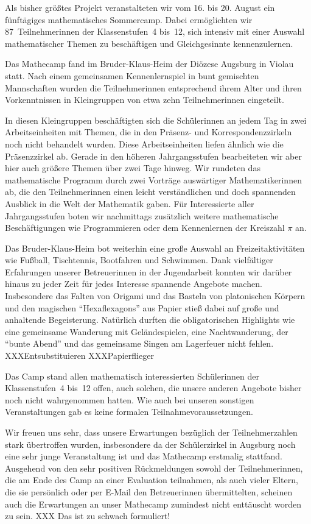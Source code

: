 \documentclass[12pt]{zettel}
\newcommand{\twopics}[2]{%
  \begin{figure}[b]
    \makebox[\textwidth][c]{%
      \texttt{[image: impressionen/\#1]}%
      \hspace*{1cm}%
      \texttt{[image: impressionen/\#2]}%
    }
  \end{figure}
}
\begin{document}
Als bisher größtes Projekt veranstalteten wir vom 16. bis 20. August ein fünftägiges
mathematisches Sommercamp. Dabei ermöglichten wir 87~Teilnehmerinnen
der Klassenstufen~4 bis~12, sich intensiv mit einer Auswahl
mathematischer Themen zu beschäftigen und Gleichgesinnte kennenzulernen.

Das Mathecamp fand im Bruder-Klaus-Heim der Diözese Augsburg in Violau statt. Nach einem gemeinsamen Kennenlernspiel in bunt gemischten Mannschaften wurden die Teilnehmerinnen
entsprechend ihrem Alter und ihren Vorkenntnissen in Kleingruppen von etwa zehn Teilnehmerinnen eingeteilt.

In diesen Kleingruppen beschäftigten sich die Schülerinnen an jedem Tag
in zwei Arbeitseinheiten mit Themen, die in den Präsenz- und Korrespondenzzirkeln noch nicht behandelt wurden. Diese Arbeitseinheiten liefen ähnlich wie die Präsenzzirkel ab.
Gerade in den höheren Jahrgangsstufen bearbeiteten wir aber hier auch größere Themen über zwei Tage hinweg. Wir rundeten das mathematische
Programm durch zwei Vorträge auswärtiger Mathematikerinnen ab, die den Teilnehmerinnen einen leicht verständlichen und doch
spannenden Ausblick in die Welt der Mathematik gaben. Für Interessierte aller Jahrgangsstufen boten wir nachmittags zusätzlich weitere mathematische Beschäftigungen wie Programmieren
oder dem Kennenlernen der Kreiszahl $\pi$ an.

\twopics{klein-07}{klein-08}

Das Bruder-Klaus-Heim bot weiterhin eine große Auswahl an Freizeitaktivitäten wie Fußball, Tischtennis, Bootfahren und Schwimmen. Dank vielfältiger Erfahrungen unserer Betreuerinnen
in der Jugendarbeit konnten wir darüber hinaus zu jeder Zeit für jedes Interesse spannende Angebote machen. Insbesondere das Falten von Origami und das Basteln von platonischen
Körpern und den magischen "`Hexaflexagons"' aus Papier stieß dabei auf große und anhaltende Begeisterung. Natürlich durften die obligatorischen Highlights wie eine gemeinsame
Wanderung mit Geländespielen, eine Nachtwanderung, der "`bunte Abend"' und das gemeinsame Singen am Lagerfeuer nicht fehlen. XXXEntsubstituieren XXXPapierflieger

Das Camp stand allen mathematisch interessierten Schülerinnen der
Klassenstufen~4 bis~12 offen, auch solchen, die unsere anderen Angebote bisher
noch nicht wahrgenommen hatten. Wie auch bei unseren sonstigen Veranstaltungen
gab es keine formalen Teilnahmevoraussetzungen.

Wir freuen uns sehr, dass unsere Erwartungen bezüglich der Teilnehmerzahlen stark übertroffen wurden, insbesondere da der Schülerzirkel in Augsburg noch eine sehr junge
Veranstaltung ist und das Mathecamp erstmalig stattfand. Ausgehend von den sehr positiven Rückmeldungen sowohl der Teilnehmerinnen, die am Ende des Camp an einer Evaluation
teilnahmen, als auch vieler Eltern, die sie persönlich oder per E-Mail den Betreuerinnen übermittelten, scheinen auch die Erwartungen an unser Mathecamp zumindest nicht enttäuscht
worden zu sein. XXX Das ist zu schwach formuliert!
\end{document}
